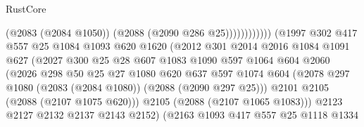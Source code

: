 \begin{lexlean}{RustCore}
\begin{coremodule}
                                                (@2083 (@2084 @1050))
                                                (@2088 (@2090 @286 @25))))))))))))
                            (@1997
                              @302
                              @417
                              @557
                              @25
                              @1084
                              @1093
                              @620
                              @1620
                              (@2012
                                @301
                                @2014
                                @2016
                                @1084
                                @1091
                                @627
                                (@2027
                                  @300
                                  @25
                                  @28
                                  @607
                                  @1083
                                  @1090
                                  @597
                                  @1064
                                  @604
                                  @2060
                                  (@2026
                                    @298
                                    @50
                                    @25
                                    @27
                                    @1080
                                    @620
                                    @637
                                    @597
                                    @1074
                                    @604
                                    (@2078
                                      @297
                                      @1080
                                      (@2083 (@2084 @1080))
                                      (@2088 (@2090 @297 @25)))
                                    @2101
                                    @2105
                                    (@2088 (@2107 @1075 @620)))
                                  @2105
                                  (@2088 (@2107 @1065 @1083)))
                                @2123
                                @2127
                                @2132
                                @2137
                                @2143
                                @2152)
                              (@2163
                                @1093
                                @417
                                @557
                                @25
                                @1118
                                @1334

\end{coremodule}
\end{lexlean}
